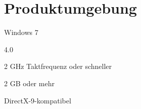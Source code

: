 \section{Produktumgebung}

\begin{description}[style=multiline,leftmargin=3.5cm]
	\item[Betriebssystem] Windows 7
	\item[.NET Framework] 4.0
	\item[Prozessor] 2 GHz Taktfrequenz oder schneller
	\item[Hauptspeicher] 2 GB oder mehr
	\item[Graphikkarte] DirectX-9-kompatibel
\end{description}
